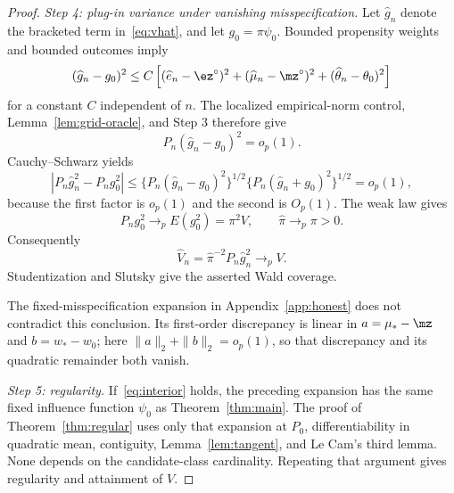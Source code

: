 \begin{proof}
\emph{Step 4: plug-in variance under vanishing misspecification.}
Let $\widehat g_n$ denote the bracketed term in~\eqref{eq:vhat}, and let
$g_0=\pi\psi_0$.  Bounded propensity weights and bounded outcomes imply
\[
 (\widehat g_n-g_0)^2
 \le C\left[
   (\widehat e_n-\ez^\circ)^2
   +(\widehat\mu_n-\mz^\circ)^2
   +(\widehat\theta_n-\theta_0)^2
 \right]
\]
for a constant $C$ independent of $n$.  The localized empirical-norm control,
Lemma~\ref{lem:grid-oracle}, and Step 3 therefore give
\[
 P_n(\widehat g_n-g_0)^2=o_p(1).
\]
Cauchy--Schwarz yields
\[
 |P_n\widehat g_n^2-P_ng_0^2|
 \le
 \{P_n(\widehat g_n-g_0)^2\}^{1/2}
 \{P_n(\widehat g_n+g_0)^2\}^{1/2}
 =o_p(1),
\]
because the first factor is $o_p(1)$ and the second is $O_p(1)$.
The weak law gives
\[
 P_ng_0^2\to_pE(g_0^2)=\pi^2V,
 \qquad
 \widehat\pi\to_p\pi>0.
\]
Consequently
\[
 \widehat V_n=\widehat\pi^{-2}P_n\widehat g_n^2\to_pV.
\]
Studentization and Slutsky give the asserted Wald coverage.

The fixed-misspecification expansion in Appendix~\ref{app:honest} does not
contradict this conclusion.  Its first-order discrepancy is linear in
$a=\mu_*-\mz$ and $b=w_*-w_0$; here
$\|a\|_2+\|b\|_2=o_p(1)$, so that discrepancy and its quadratic remainder both
vanish.

\emph{Step 5: regularity.}
If~\eqref{eq:interior} holds, the preceding expansion has the same fixed
influence function $\psi_0$ as Theorem~\ref{thm:main}.  The proof of
Theorem~\ref{thm:regular} uses only that expansion at $P_0$, differentiability
in quadratic mean, contiguity, Lemma~\ref{lem:tangent}, and Le Cam's third
lemma.  None depends on the candidate-class cardinality.  Repeating that
argument gives regularity and attainment of $V$.
\end{proof}

